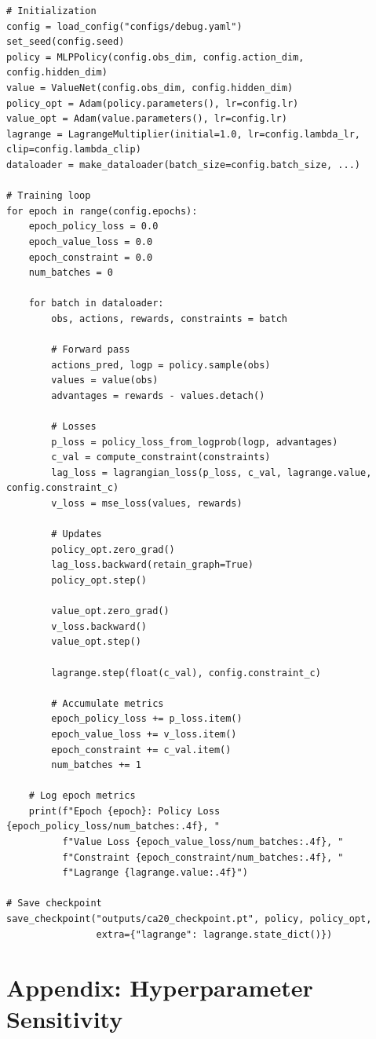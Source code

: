 \begin{verbatim}
# Initialization
config = load_config("configs/debug.yaml")
set_seed(config.seed)
policy = MLPPolicy(config.obs_dim, config.action_dim, config.hidden_dim)
value = ValueNet(config.obs_dim, config.hidden_dim)
policy_opt = Adam(policy.parameters(), lr=config.lr)
value_opt = Adam(value.parameters(), lr=config.lr)
lagrange = LagrangeMultiplier(initial=1.0, lr=config.lambda_lr, clip=config.lambda_clip)
dataloader = make_dataloader(batch_size=config.batch_size, ...)

# Training loop
for epoch in range(config.epochs):
    epoch_policy_loss = 0.0
    epoch_value_loss = 0.0
    epoch_constraint = 0.0
    num_batches = 0
    
    for batch in dataloader:
        obs, actions, rewards, constraints = batch
        
        # Forward pass
        actions_pred, logp = policy.sample(obs)
        values = value(obs)
        advantages = rewards - values.detach()
        
        # Losses
        p_loss = policy_loss_from_logprob(logp, advantages)
        c_val = compute_constraint(constraints)
        lag_loss = lagrangian_loss(p_loss, c_val, lagrange.value, config.constraint_c)
        v_loss = mse_loss(values, rewards)
        
        # Updates
        policy_opt.zero_grad()
        lag_loss.backward(retain_graph=True)
        policy_opt.step()
        
        value_opt.zero_grad()
        v_loss.backward()
        value_opt.step()
        
        lagrange.step(float(c_val), config.constraint_c)
        
        # Accumulate metrics
        epoch_policy_loss += p_loss.item()
        epoch_value_loss += v_loss.item()
        epoch_constraint += c_val.item()
        num_batches += 1
    
    # Log epoch metrics
    print(f"Epoch {epoch}: Policy Loss {epoch_policy_loss/num_batches:.4f}, "
          f"Value Loss {epoch_value_loss/num_batches:.4f}, "
          f"Constraint {epoch_constraint/num_batches:.4f}, "
          f"Lagrange {lagrange.value:.4f}")

# Save checkpoint
save_checkpoint("outputs/ca20_checkpoint.pt", policy, policy_opt, 
                extra={"lagrange": lagrange.state_dict()})
\end{verbatim}

\section{Appendix: Hyperparameter Sensitivity}
\label{app:sensitivity}

